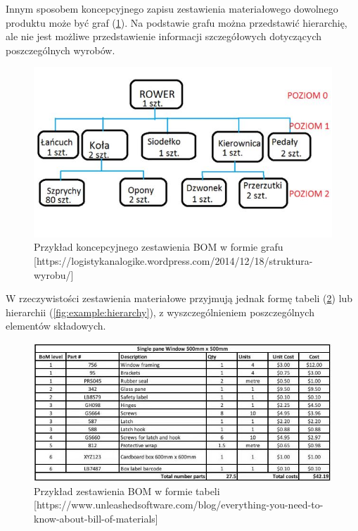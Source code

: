 \documentclass[12pt,twoside]{article}
\begin{document}
Innym sposobem koncepcyjnego zapisu zestawienia materiałowego dowolnego produktu może być graf (\ref{fig:example:graph}). Na podstawie grafu można przedstawić hierarchię, ale nie jest możliwe przedstawienie informacji szczegółowych dotyczących poszczególnych wyrobów.

\begin{figure}[ht]
	\centering
	\includegraphics[width=\textwidth]{figures/examples/graph.jpg}
	\caption{Przykład koncepcyjnego zestawienia BOM w formie grafu [https://logistykanalogike.wordpress.com/2014/12/18/struktura-wyrobu/]}
\label{fig:example:graph}
\end{figure}

W rzeczywistości zestawienia materiałowe przyjmują jednak formę tabeli (\ref{fig:example:table}) lub hierarchii (\ref{fig:example:hierarchy}), z wyszczególnieniem poszczególnych elementów składowych.

\begin{figure}[ht]
	\centering
	\includegraphics[width=\textwidth]{figures/examples/table.jpg}
	\caption{Przykład zestawienia BOM w formie tabeli [https://www.unleashedsoftware.com/blog/everything-you-need-to-know-about-bill-of-materials]}
\label{fig:example:table}
\end{figure}
\end{document}
